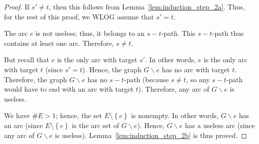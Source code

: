 \documentclass[12pt]{amsart}
\theoremstyle{definition}
\newcommand{\set}[1]{\left\{ #1 \right\}}
\begin{document}
\begin{proof}
If $s' \neq t$, then this follows from
Lemma~\ref{lem:induction_step_2a}.
Thus, for the rest of this proof, we WLOG assume that $s' = t$.

The arc $e$ is not useless; thus, it belongs to an $s-t$-path.
This $s-t$-path thus contains at least one arc.
Therefore, $s \neq t$.

But recall that $e$ is the only arc with target $s'$.
In other words, $e$ is the only arc with target $t$
(since $s' = t$).
Hence, the graph $G \backslash e$ has no arc with target $t$.
Therefore, the graph $G \backslash e$ has no $s-t$-path
(because $s \neq t$, so any $s-t$-path would have to end with an arc with target $t$).
Therefore, any arc of $G \backslash e$ is useless.

We have $\# E > 1$; hence, the set $E \setminus \set{e}$ is nonempty.
In other words, $G \backslash e$ has an arc (since
$E \setminus \set{e}$ is the arc set of $G \backslash e$).
Hence, $G \backslash e$ has a useless arc
(since any arc of $G \backslash e$ is useless).
Lemma~\ref{lem:induction_step_2b} is thus proved.
\end{proof}
\end{document}
